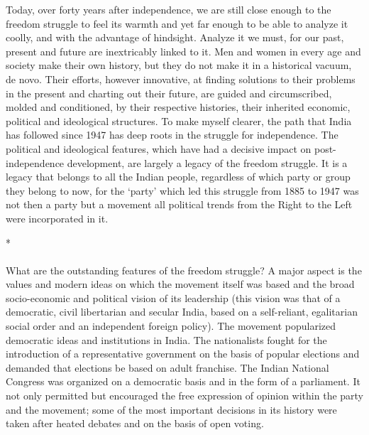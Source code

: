 \begin{multicols}{2}
Today, over forty years after independence, we are still close enough to the freedom struggle to feel its warmth and yet far enough to be able to analyze it coolly, and with the advantage of hindsight. Analyze it we must, for our past, present and future are inextricably linked to it. Men and women in every age and society make their own history, but they do not make it in a historical vacuum, de novo. Their efforts, however innovative, at finding solutions to their problems in the present and charting out their future, are guided and circumscribed, molded and conditioned, by their respective histories, their inherited economic, political and ideological structures. To make myself clearer, the path that India has followed since 1947 has deep roots in the struggle for independence. The political and ideological features, which have had a decisive impact on post-independence development, are largely a legacy of the freedom struggle. It is a legacy that belongs to all the Indian people, regardless of which party or group they belong to now, for the `party' which led this struggle from 1885 to 1947 was not then a party but a movement all political trends from the Right to the Left were incorporated in it.

\begin{center}*\end{center}

\paragraph*{}
What are the outstanding features of the freedom struggle? A major aspect is the values and modern ideas on which the movement itself was based and the broad socio-economic and political vision of its leadership (this vision was that of a democratic, civil libertarian and secular India, based on a self-reliant, egalitarian social order and an independent foreign policy). The movement popularized democratic ideas and institutions in India. The nationalists fought for the introduction of a representative government on the basis of popular elections and demanded that elections be based on adult franchise. The Indian National Congress was organized on a democratic basis and in the form of a parliament. It not only permitted but encouraged the free expression of opinion within the party and the movement; some of the most important decisions in its history were taken after heated debates and on the basis of open voting.


\end{multicols}

